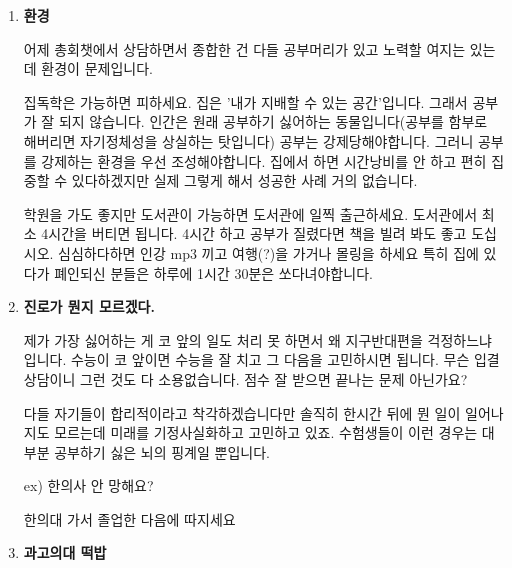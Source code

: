\vspace{5mm}
\begin{enumerate}
    \item \textbf{환경}
    \vspace{5mm}

    어제 총회챗에서 상담하면서 종합한 건
    다들 공부머리가 있고 노력할 여지는 있는데 환경이 문제입니다.
    \vspace{5mm}

    집독학은 가능하면 피하세요. 집은 '내가 지배할 수 있는 공간'입니다. 그래서 공부가 잘 되지 않습니다.
    인간은 원래 공부하기 싫어하는 동물입니다(공부를 함부로 해버리면 자기정체성을 상실하는 탓입니다)
    공부는 강제당해야합니다. 그러니 공부를 강제하는 환경을 우선 조성해야합니다.
    집에서 하면 시간낭비를 안 하고 편히 집중할 수 있다하겠지만 실제 그렇게 해서 성공한 사례 거의 없습니다.
    \vspace{5mm}

    학원을 가도 좋지만 도서관이 가능하면 도서관에 일찍 출근하세요.
    도서관에서 최소 4시간을 버티면 됩니다. 4시간 하고 공부가 질렸다면 책을 빌려 봐도 좋고 도십시오.
    심심하다하면 인강 mp3 끼고 여행(?)을 가거나 몰링을 하세요
    특히 집에 있다가 폐인되신 분들은 하루에 1시간 30분은 쏘다녀야합니다.
    \vspace{5mm}

    \item \textbf{진로가 뭔지 모르겠다.}
    \vspace{5mm}

    제가 가장 싫어하는 게 코 앞의 일도 처리 못 하면서 왜 지구반대편을 걱정하느냐입니다.
    수능이 코 앞이면 수능을 잘 치고 그 다음을 고민하시면 됩니다.
    무슨 입결상담이니 그런 것도 다 소용없습니다. 점수 잘 받으면 끝나는 문제 아닌가요?
    \vspace{5mm}

    다들 자기들이 합리적이라고 착각하겠습니다만 솔직히 한시간 뒤에 뭔 일이 일어나지도 모르는데 미래를 기정사실화하고 고민하고 있죠.
    수험생들이 이런 경우는 대부분 공부하기 싫은 뇌의 핑계일 뿐입니다.
    \vspace{5mm}

    ex) 한의사 안 망해요?
    \vspace{5mm}

    한의대 가서 졸업한 다음에 따지세요
    \vspace{5mm}

    \item \textbf{과고의대 떡밥}
    \vspace{5mm}


\end{enumerate}
